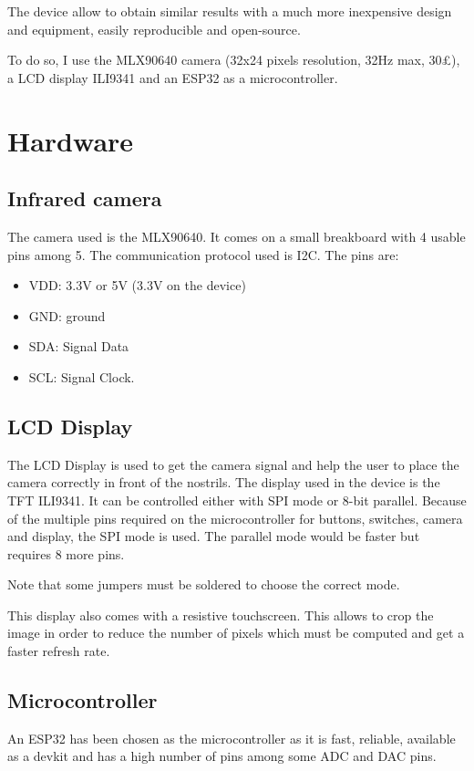 \documentclass[a4paper]{article}
\begin{document}
The device allow to obtain similar results with a much more inexpensive design and equipment, easily reproducible and open-source.

To do so, I use the MLX90640 camera (32x24 pixels resolution, 32Hz max, 30£), a LCD display ILI9341 and an ESP32 as a microcontroller.

\section{Hardware}
\subsection{Infrared camera}
The camera used is the MLX90640. It comes on a small breakboard with 4 usable pins among 5. The communication protocol used is I2C.
The pins are:
\begin{itemize}
    \item VDD: 3.3V or 5V (3.3V on the device)
    \item GND: ground
    \item SDA: Signal Data
    \item SCL: Signal Clock.
\end{itemize}


\subsection{LCD Display}
The LCD Display is used to get the camera signal and help the user to place the camera correctly in front of the nostrils.
The display used in the device is the TFT ILI9341. It can be controlled either with SPI mode or 8-bit parallel. Because of the multiple pins required on the microcontroller for buttons, switches, camera and display, the SPI mode is used. The parallel mode would be faster but requires 8 more pins.

Note that some jumpers must be soldered to choose the correct mode.

This display also comes with a resistive touchscreen. This allows to crop the image in order to reduce the number of pixels which must be computed and get a faster refresh rate.

\subsection{Microcontroller}
An ESP32 has been chosen as the microcontroller as it is fast, reliable, available as a devkit and has a high number of pins among some ADC and DAC pins.
\end{document}
